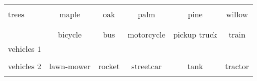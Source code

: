 \documentclass[preprint,12pt]{elsarticle}
\begin{document}
\begin{table}[!t]
{\begin{tabular}{l|ccccc}
    \multirow{3}{*}{\large{trees}} & \cellcolor{yellow!50} & \cellcolor{green!30} & \cellcolor{green!30} & \cellcolor{yellow!50} & \cellcolor{yellow!50} \\
    & \cellcolor{yellow!50}\large{maple} & \cellcolor{green!30}\large{oak} & \cellcolor{green!30}\large{palm} & \cellcolor{yellow!50}\large{pine} & \cellcolor{yellow!50}\large{willow} \\
    & \cellcolor{yellow!50} & \cellcolor{green!30} & \cellcolor{green!30} & \cellcolor{yellow!50} & \cellcolor{yellow!50} \\
    
    \cellcolor{gray!20} & \cellcolor{yellow!50} & \cellcolor{yellow!50} & \cellcolor{green!30} & \cellcolor{yellow!50} & \cellcolor{green!30} \\
    \cellcolor{gray!20} & \cellcolor{yellow!50}\large{bicycle} & \cellcolor{yellow!50}\large{bus} & \cellcolor{green!30}\large{motorcycle} & \cellcolor{yellow!50}\large{pickup truck} & \cellcolor{green!30}\large{train} \\
    \multirow{-3}{*}{\cellcolor{gray!20}\large{vehicles $1$}} & \cellcolor{yellow!50} & \cellcolor{yellow!50} & \cellcolor{green!30} & \cellcolor{yellow!50} & \cellcolor{green!30} \\
    
    \multirow{3}{*}{\large{vehicles $2$}} & \cellcolor{green!30} & \cellcolor{yellow!50} & \cellcolor{yellow!50} & \cellcolor{green!30} & \cellcolor{yellow!50} \\
    & \cellcolor{green!30}\large{lawn-mower} & \cellcolor{yellow!50}\large{rocket} & \cellcolor{yellow!50}\large{streetcar} & \cellcolor{green!30}\large{tank} & \cellcolor{yellow!50}\large{tractor} \\
    & \cellcolor{green!30} & \cellcolor{yellow!50} & \cellcolor{yellow!50} & \cellcolor{green!30} & \cellcolor{yellow!50} \\
    \bottomrule
    \end{tabular}%
    }
    \vskip -0.1in
\end{table}
\end{document}

